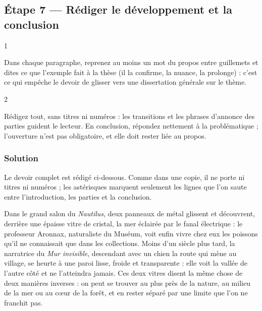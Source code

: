 \documentclass[11pt,a4paper]{article}
\begin{document}
\hypertarget{uxe9tape-7-ruxe9diger-le-duxe9veloppement-et-la-conclusion}{%
\subsection{Étape 7 --- Rédiger le développement et la conclusion}\label{uxe9tape-7-ruxe9diger-le-duxe9veloppement-et-la-conclusion}}

\begin{indication}{1}

Dans chaque paragraphe, reprenez au moins un mot du propos entre guillemets et dites ce que l'exemple fait à la thèse (il la confirme, la nuance, la prolonge) : c'est ce qui empêche le devoir de glisser vers une dissertation générale sur le thème.

\end{indication}

\begin{indication}{2}

Rédigez tout, sans titres ni numéros : les transitions et les phrases d'annonce des parties guident le lecteur. En conclusion, répondez nettement à la problématique ; l'ouverture n'est pas obligatoire, et elle doit rester liée au propos.

\end{indication}

\hypertarget{solution-6}{%
\subsubsection{Solution}\label{solution-6}}

Le devoir complet est rédigé ci-dessous. Comme dans une copie, il ne porte ni titres ni numéros ; les astérisques marquent seulement les lignes que l'on saute entre l'introduction, les parties et la conclusion.

Dans le grand salon du \emph{Nautilus}, deux panneaux de métal glissent et découvrent, derrière une épaisse vitre de cristal, la mer éclairée par le fanal électrique : le professeur Aronnax, naturaliste du Muséum, voit enfin vivre chez eux les poissons qu'il ne connaissait que dans les collections. Moins d'un siècle plus tard, la narratrice du \emph{Mur invisible}, descendant avec un chien la route qui mène au village, se heurte à une paroi lisse, froide et transparente : elle voit la vallée de l'autre côté et ne l'atteindra jamais. Ces deux vitres disent la même chose de deux manières inverses : on peut se trouver au plus près de la nature, au milieu de la mer ou au cœur de la forêt, et en rester séparé par une limite que l'on ne franchit pas.
\end{document}
